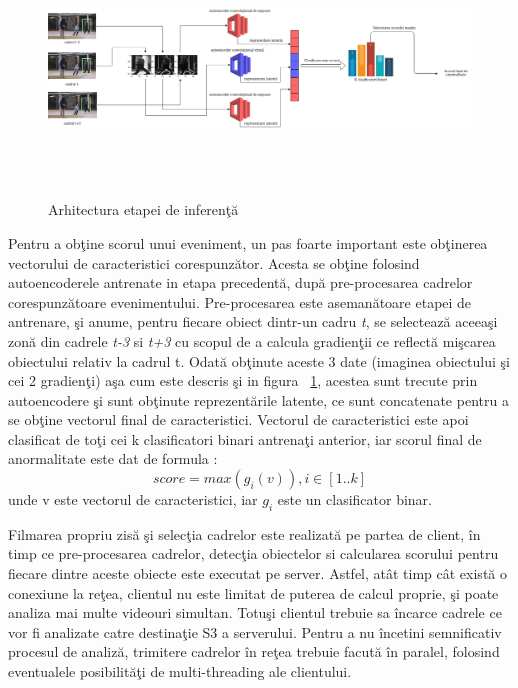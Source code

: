 \documentclass[a4paper,12pt]{report}
\begin{document}
\begin{figure}[h]
\begin{center}
        \includegraphics[width=1\textwidth,height=6cm]{images/inference_architecture}
			 \label{fig:inference_architecture}
			 \caption{Arhitectura etapei de inferenţă}
\end{center}
\end{figure}
Pentru a obţine scorul unui eveniment, un pas foarte important este obţinerea vectorului de caracteristici corespunzător. Acesta se obţine folosind autoencoderele antrenate in etapa precedentă, după pre-procesarea cadrelor corespunzătoare evenimentului.  Pre-procesarea este asemanătoare etapei de antrenare, şi anume, pentru fiecare obiect dintr-un cadru \emph{t}, se selectează aceeaşi zonă din cadrele \emph{t-3} si \emph{t+3} cu scopul de a calcula gradienţii ce reflectă mişcarea obiectului relativ la cadrul t. Odată obţinute aceste 3 date (imaginea obiectului şi cei 2 gradienţi) aşa cum este descris şi in figura
~\ref{fig:inference_architecture}, acestea sunt trecute prin autoencodere şi sunt obţinute reprezentările latente, ce sunt concatenate pentru a se obţine vectorul final de caracteristici. Vectorul de caracteristici este apoi clasificat de toţi cei k clasificatori binari antrenaţi anterior, iar scorul final de anormalitate este dat de formula : \[score = max(g_{i}(v)), i \in [1..k]\] unde v este vectorul de caracteristici, iar \(g_{i}\) este un clasificator binar.
\par
Filmarea propriu zisă şi selecţia cadrelor este realizată pe partea de client, în timp ce pre-procesarea cadrelor, detecţia obiectelor si calcularea scorului pentru fiecare dintre aceste obiecte este executat pe server. Astfel, atât timp cât există o conexiune la reţea, clientul nu este limitat de puterea de calcul proprie, şi poate analiza mai multe videouri simultan. Totuşi clientul trebuie sa încarce cadrele ce vor fi analizate catre destinaţie S3 a serverului. Pentru a nu încetini semnificativ procesul de analiză, trimitere cadrelor în reţea trebuie facută în paralel, folosind eventualele posibilităţi de multi-threading ale clientului.
\end{document}
